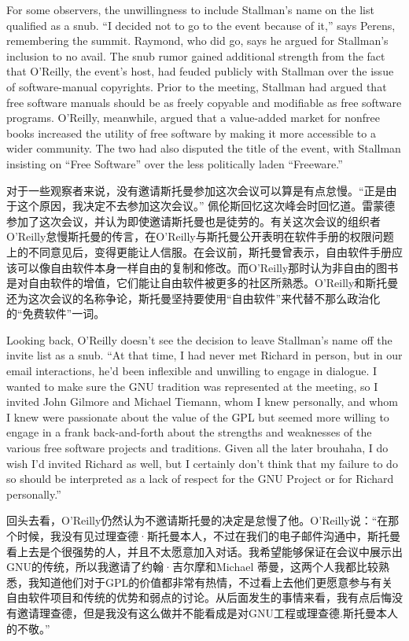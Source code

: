 \ifdefined\eng
For some observers, the unwillingness to include Stallman's name on the list qualified as a snub. ``I decided not to go to the event because of it,'' says Perens, remembering the summit. Raymond, who did go, says he argued for Stallman's inclusion to no avail. The snub rumor gained additional strength from the fact that O'Reilly, the event's host, had feuded publicly with Stallman over the issue of software-manual copyrights. Prior to the meeting, Stallman had argued that free software manuals should be as freely copyable and modifiable as free software programs. O'Reilly, meanwhile, argued that a value-added market for nonfree books increased the utility of free software by making it more accessible to a wider community. The two had also disputed the title of the event, with Stallman insisting on ``Free Software'' over the less politically laden ``Freeware.''
\fi

\ifdefined\chs
对于一些观察者来说，没有邀请斯托曼参加这次会议可以算是有点怠慢。``正是由于这个原因，我决定不去参加这次会议。'' 佩伦斯回忆这次峰会时回忆道。雷蒙德参加了这次会议，并认为即使邀请斯托曼也是徒劳的。有关这次会议的组织者O'Reilly怠慢斯托曼的传言，在O'Reilly与斯托曼公开表明在软件手册的权限问题上的不同意见后，变得更能让人信服。在会议前，斯托曼曾表示，自由软件手册应该可以像自由软件本身一样自由的复制和修改。而O'Reilly那时认为非自由的图书是对自由软件的增值，它们能让自由软件被更多的社区所熟悉。O'Reilly和斯托曼还为这次会议的名称争论，斯托曼坚持要使用``自由软件''来代替不那么政治化的``免费软件''一词。
\fi

\ifdefined\eng
Looking back, O'Reilly doesn't see the decision to leave Stallman's name off the invite list as a snub. ``At that time, I had never met Richard in person, but in our email interactions, he'd been inflexible and unwilling to engage in dialogue. I wanted to make sure the GNU tradition was represented at the meeting, so I invited John Gilmore and Michael Tiemann, whom I knew personally, and whom I knew were passionate about the value of the GPL but seemed more willing to engage in a frank back-and-forth about the strengths and weaknesses of the various free software projects and traditions. Given all the later brouhaha, I do wish I'd invited Richard as well, but I certainly don't think that my failure to do so should be interpreted as a lack of respect for the GNU Project or for Richard personally.''
\fi

\ifdefined\chs
回头去看，O'Reilly仍然认为不邀请斯托曼的决定是怠慢了他。O'Reilly说：``在那个时候，我没有见过理查德·斯托曼本人，不过在我们的电子邮件沟通中，斯托曼看上去是个很强势的人，并且不太愿意加入对话。我希望能够保证在会议中展示出GNU的传统，所以我邀请了约翰·吉尔摩和Michael 蒂曼，这两个人我都比较熟悉，我知道他们对于GPL的价值都非常有热情，不过看上去他们更愿意参与有关自由软件项目和传统的优势和弱点的讨论。从后面发生的事情来看，我有点后悔没有邀请理查德，但是我没有这么做并不能看成是对GNU工程或理查德.斯托曼本人的不敬。''
\fi

